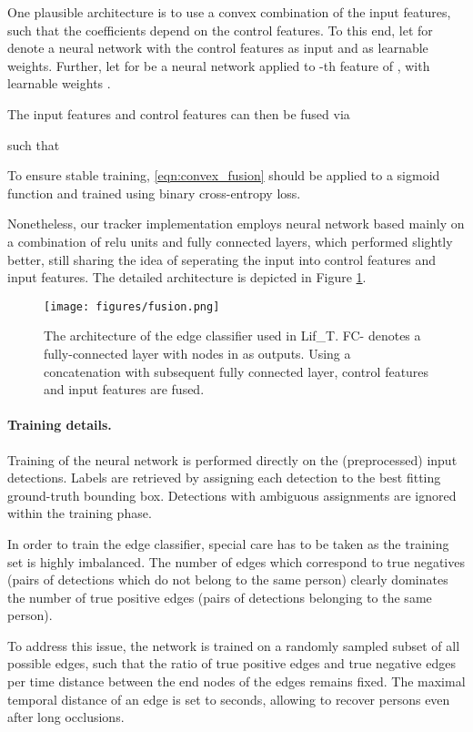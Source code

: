 \documentclass{article}
\begin{document}
One plausible architecture is to use a convex combination of the input features, such that the coefficients depend on the control features. To this end, let  for  denote a neural network with the control features as input and  as learnable weights. Further, let  for  be a neural network applied to -th feature of , with learnable weights . 

The input features and control features can then be fused via

{}
such that

To ensure stable training, \eqref{eqn:convex_fusion} should be applied to a sigmoid function and trained using binary cross-entropy loss. 


Nonetheless, our tracker implementation employs neural network based mainly on a combination of relu units and fully connected layers, which performed slightly better, still sharing the idea of seperating the input into  control features and input features.
The detailed architecture is depicted in Figure \ref{fig:fusion_network}.


\begin{figure}
    \centering
    \texttt{[image: figures/fusion.png]}
    \caption{The architecture of the edge classifier used in Lif\_T. FC- denotes a fully-connected layer with  nodes in as outputs. 
    Using a concatenation with subsequent fully connected layer,  control features and  input features are fused. }
    \label{fig:fusion_network}
\end{figure}{}


\paragraph{Training details.}
Training of the neural network is performed directly on the (preprocessed) input detections.  Labels are retrieved by assigning each detection to the best fitting ground-truth bounding box. Detections with ambiguous assignments are ignored within the training phase. 

In order to train the edge classifier, special care has to be taken as the training set is highly imbalanced. The number of edges which correspond to true negatives (pairs of detections which do not belong to the same person) clearly dominates the number of true positive edges (pairs of detections belonging to the same person). 

To address this issue, the network is trained on a randomly sampled subset of all possible edges, such that the ratio of true positive edges and true negative edges per time distance between the end nodes of the edges remains fixed.  The maximal temporal distance of an edge is set to  seconds, allowing to recover persons even after long occlusions. 
\end{document}
